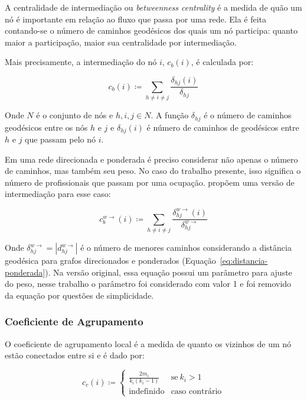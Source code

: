 \documentclass[12pt,a4paper]{article}
\theoremstyle{hypo}
\newcommand{\defn}{\coloneqq} %
\newcommand{\weighteddir}[1]{#1^{w\rightarrow}} %
\begin{document}
A centralidade de intermediação ou \textit{betweenness centrality} é a medida de quão um nó é importante em relação ao fluxo que passa por uma rede. Ela é feita contando-se o número de caminhos geodésicos dos quais um nó participa: quanto maior a participação, maior sua centralidade por intermediação.

Mais precisamente, a intermediação do nó $i$, $c_b(i)$, é calculada por:

\begin{equation}
c_b(i) \defn \sum_{h \neq i \neq j} \frac{\delta_{hj}(i)}{\delta_{hj}}
\end{equation}

Onde $N$ é o conjunto de nós e $h, i, j \in N$. A função $\delta_{hj}$ é o número de caminhos geodésicos entre os nós $h$ e $j$ e $\delta_{hj}(i)$ é número de caminhos de geodésicos entre $h$ e $j$ que passam pelo nó $i$.

Em uma rede direcionada e ponderada é preciso considerar não apenas o número de caminhos, mas também seu peso. No caso do trabalho presente, isso significa o número de profissionais que passam por uma ocupação.  propõem uma versão de intermediação para esse caso:

\begin{equation}
\weighteddir{c}_{b}(i) \defn \sum_{h \neq i \neq j} \frac{\weighteddir{\delta}_{hj}(i)}{\weighteddir{\delta}_{hj}}
\end{equation}

Onde $\weighteddir{\delta}_{hj} = |\weighteddir{d}_{hj}|$ é o número de menores caminhos considerando a distância geodésica para grafos direcionados e ponderados (Equação~\ref{eq:distancia-ponderada}). Na versão original, essa equação possui um parâmetro para ajuste do peso, nesse trabalho o parâmetro foi considerado com valor 1 e foi removido da equação por questões de simplicidade.

\subsubsection{Coeficiente de Agrupamento}

O coeficiente de agrupamento local é a medida de quanto os vizinhos de um nó estão conectados entre si e é dado por:

\begin{equation}
c_c(i) \defn \begin{cases}
    \frac{2m_i}{k_i(k_i - 1)} & \text{se}\ k_i > 1 \\
    \text{indefinido}         & \text{caso contrário}
  \end{cases}
\end{equation}
\end{document}
